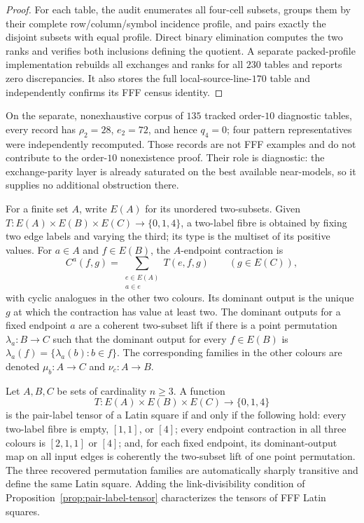 \begin{proof}
For each table, the audit enumerates all four-cell subsets, groups them by
their complete row/column/symbol incidence profile, and pairs exactly the
disjoint subsets with equal profile.  Direct binary elimination computes the
two ranks and verifies both inclusions defining the quotient.  A separate
packed-profile implementation rebuilds all exchanges and ranks for all
$230$ tables and reports zero discrepancies.  It also stores the full
local-source-line-$170$ table and independently confirms its FFF census
identity.
\end{proof}

On the separate, nonexhaustive corpus of $135$ tracked order-$10$ diagnostic
tables, every record has $\rho_2=28$, $e_2=72$, and hence $q_4=0$; four
pattern representatives were independently recomputed.  Those records are
not FFF examples and do not contribute to the order-$10$ nonexistence proof.
Their role is diagnostic:
the exchange-parity layer is already saturated on the best available
near-models, so it supplies no additional obstruction there.

\begin{definition}
For a finite set $A$, write $E(A)$ for its unordered two-subsets.  Given
$T:E(A)\times E(B)\times E(C)\to\{0,1,4\}$, a two-label fibre is obtained by
fixing two edge labels and varying the third; its type is the multiset of its
positive values.  For $a\in A$ and $f\in E(B)$, the $A$-endpoint contraction is
\[
 C^a(f,g)=\sum_{\substack{e\in E(A)\\a\in e}}T(e,f,g)
 \qquad(g\in E(C)),
\]
with cyclic analogues in the other two colours.  Its dominant output is the
unique $g$ at which the contraction has value at least two.  The dominant
outputs for a fixed endpoint $a$ are a coherent two-subset lift if there is a
point permutation $\lambda_a:B\to C$ such that the dominant output for every
$f\in E(B)$ is $\lambda_a(f)=\{\lambda_a(b):b\in f\}$.  The corresponding
families in the other colours are denoted $\mu_b:A\to C$ and
$\nu_c:A\to B$.
\end{definition}

\begin{theorem}
\label{thm:endpoint-characterization}
Let $A,B,C$ be sets of cardinality $n\geq3$.  A function
\[
 T:E(A)\times E(B)\times E(C)\longrightarrow\{0,1,4\}
\]
is the pair-label tensor of a Latin square if and only if the following hold:
every two-label fibre is empty, $[1,1]$, or $[4]$; every endpoint contraction
in all three colours is $[2,1,1]$ or $[4]$; and, for each fixed endpoint, its
dominant-output map on all input edges is coherently the two-subset lift of one
point permutation.  The three recovered permutation families are
automatically sharply transitive and define the same Latin square.  Adding
the link-divisibility condition of
Proposition~\ref{prop:pair-label-tensor} characterizes the tensors of FFF
Latin squares.
\end{theorem}


